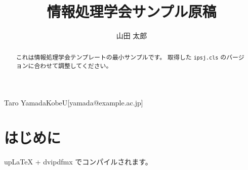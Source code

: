 \documentclass[submit]{ipsj}
\begin{document}
\title{情報処理学会サンプル原稿}
\author{山田 太郎}{Taro Yamada}{KobeU}[yamada@example.ac.jp]

\begin{abstract}
これは情報処理学会テンプレートの最小サンプルです。
取得した \texttt{ipsj.cls} のバージョンに合わせて調整してください。
\end{abstract}

\maketitle

\section{はじめに}
upLaTeX + dvipdfmx でコンパイルされます。
\end{document}
